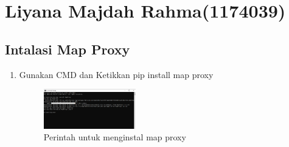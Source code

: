 \section{Liyana Majdah Rahma(1174039)}
\subsection{Intalasi Map Proxy}
\begin{enumerate}
    \item Gunakan CMD dan Ketikkan pip install map proxy
    \hfill\break
    \begin{figure}[H]
		\includegraphics[width=4cm]{figures/1174039/tugas5/1.png}
		\centering
		\caption{Perintah untuk menginstal map proxy}
    \end{figure}
\end{enumerate}

